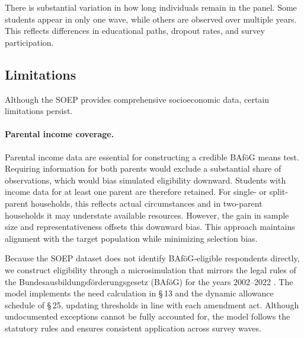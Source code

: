 There is substantial variation in how long individuals remain in the panel. Some students appear in only one wave, while others are observed over multiple years. This reflects differences in educational paths, dropout rates, and survey participation.

\subsection{Limitations}

Although the SOEP provides comprehensive socioeconomic data, certain limitations persist.

\paragraph{Parental income coverage.}
Parental income data are essential for constructing a credible BAföG means test. 
Requiring information for both parents would exclude a substantial share of observations, which would bias simulated eligibility downward. 
Students with income data for at least one parent are therefore retained. 
For single- or split-parent households, this reflects actual circumstances and in two-parent households it may understate available resources. 
However, the gain in sample size and representativeness offsets this downward bias. 
This approach maintains alignment with the target population while minimizing selection bias.

Because the SOEP dataset does not identify BAföG‑eligible respondents directly, we construct eligibility through a microsimulation that mirrors the legal rules of the Bundesausbildungsförderungsgesetz (BAföG) for the years 2002–2022 \citep{bafoeg_law,bafoeg20,bafoeg21,bafoeg22,bafoeg23,bafoeg24,bafoeg25,bafoeg26,bafoeg27,bafoeg28,bafoeg29}.  
The model implements the need calculation in §\,13 and the dynamic allowance schedule of §\,25, updating thresholds in line with each amendment act.  
Although undocumented exceptions cannot be fully accounted for, the model follows the statutory rules and ensures consistent application across survey waves.

